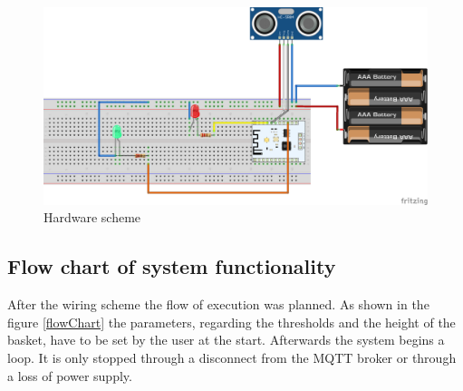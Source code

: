 \documentclass{article}
\begin{document}
\begin{figure}[]
	\centering \includegraphics[scale=0.4]{images/schema_bb.png}
	\caption{Hardware scheme}
	\label{schema_bb}
\end{figure}

\subsection{Flow chart of system functionality}
After the wiring scheme the flow of execution was planned. As shown in the figure \ref{flowChart} the parameters, regarding the thresholds and the height of the basket, have to be set by the user at the start. Afterwards the system begins a loop. It is only stopped through a disconnect from the MQTT broker or through a loss of power supply.
\end{document}
